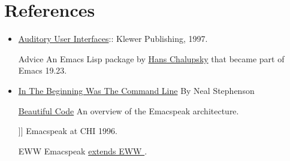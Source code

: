 \documentclass[11pt]{article}
\begin{document}
\section{References}
\label{sec-17}

\begin{itemize}
\item \href{http://emacspeak.sourceforge.net/raman/aui/aui.html}{Auditory User Interfaces}::  Klewer Publishing, 1997.
\item[{Advice }] An Emacs Lisp package by    \href{http://www.isi.edu/~hans/}{Hans Chalupsky} that
became part of Emacs 19.23.
\item \href{http://artlung.com/smorgasborg/C_R_Y_P_T_O_N_O_M_I_C_O_N.shtml}{In The Beginning Was The Command Line} By Neal Stephenson
\item[{\href{http://emacspeak.blogspot.com/2007/07/emacspeak-and-beautiful-code.html}{Beautiful Code}}] An overview of the Emacspeak architecture.
\item[{\label{http://emacspeak.sourceforge.net/raman/publications/chi96-emacspeak/-Speech-Enabled-Applications}]]}] Emacspeak at CHI 1996.
\item[{EWW}] Emacspeak  \href{http://emacspeak.blogspot.com/2014/05/emacspeak-eww-updates-for-complete.html}{extends EWW }.
\end{itemize}
\end{document}
